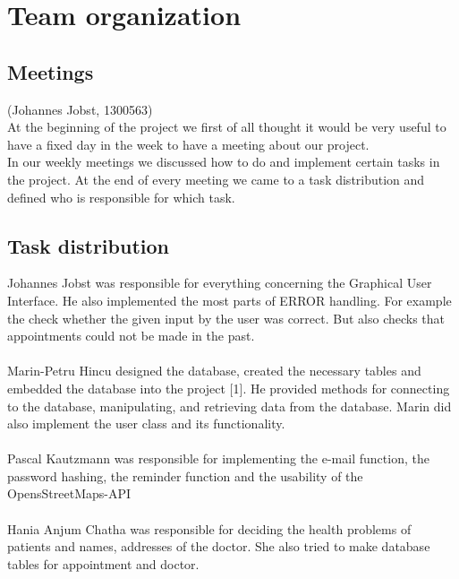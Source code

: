 \documentclass[a4paper, 12pt]{report}
\begin{document}
\chapter{Team organization}
\section{Meetings}
{\tiny (Johannes Jobst, 1300563)\\}
At the beginning of the project we first of all thought it would be very useful 
to have a fixed day in the week to have a meeting about our project. \\
In our weekly meetings we discussed how to do and implement certain tasks in the project.
At the end of every meeting we came to a task distribution and defined who is
responsible for which task. 

\section{Task distribution}
Johannes Jobst was responsible for everything concerning the Graphical User Interface.
He also implemented the most parts of ERROR handling. For example the check whether the given
input by the user was correct. But also checks that appointments could not be made in the past. \\ \\
Marin-Petru Hincu designed the database, created the necessary tables and embedded the database into the project [1]. He provided methods for connecting to the database, manipulating, and retrieving data from the database. Marin did also implement the user class and its functionality. \\ \\
Pascal Kautzmann was responsible for implementing the e-mail function, the password hashing, the reminder function and the usability of the OpensStreetMaps-API \\ 
	\\
Hania Anjum Chatha was responsible for deciding the health problems of patients and names, addresses of the doctor. She also tried to make database tables for appointment and doctor.
\end{document}
